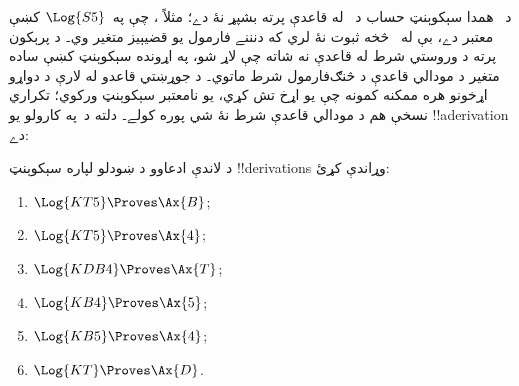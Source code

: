 \documentclass[../../../include/open-logic-section]{subfiles}
\begin{document}
\begin{ex}
د~ همدا سېکوېنټ حساب د~\Cut{} له قاعدې پرته بشپړ نۀ دے؛
مثلاً ، چې په~$\Log{S5}$ کښې معتبر دے، بې له~\Cut
څخه ثبوت نۀ لري که دنننے فارمول يو قضيېيز متغير وي۔ د پرېکون
پرته د وروستي شرط له قاعدې نه شاته چې لاړ شو، په اړونده
سېکوېنټ کښې ساده متغير د مودالي قاعدې د څنګ‌فارمول شرط ماتوي۔
د جوړښتي قاعدو له لارې د دواړو اړخونو هره ممکنه کمونه چې
يو اړخ تش کړي، يو نامعتبر سېکوېنټ ورکوي؛ تکراري نسخې هم
د مودالي قاعدې شرط نۀ شي پوره کولے۔ دلته د~\Cut په کارولو
يو !!a{derivation} دے:
\begin{prooftree}
\end{prooftree}
\end{ex}

\begin{prob}
د لاندې ادعاوو د ښودلو لپاره سېکوېنټ !!{derivation}s وړاندې کړئ:
  \begin{enumerate}
  \item $\Log{KT5} \Proves \Ax{B}$;
  \item $\Log{KT5} \Proves \Ax{4}$;
  \item $\Log{KDB4} \Proves \Ax{T}$;
  \item $\Log{KB4} \Proves \Ax{5}$;
  \item $\Log{KB5} \Proves \Ax{4}$;
  \item $\Log{KT} \Proves \Ax{D}$.
  \end{enumerate}
\end{prob}
\end{document}
